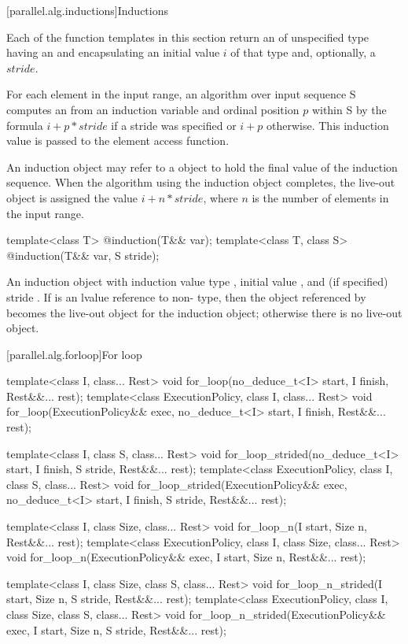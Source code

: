 [parallel.alg.inductions]{Inductions}

\pnum
Each of the function templates in this section return an  of unspecified type having an  and encapsulating an initial value $i$ of that type and, optionally, a $stride$.

\pnum
For each element in the input range, an algorithm over input sequence S computes an  from an induction variable and ordinal position $p$ within S by the formula $i + p * stride$ if a stride was specified or $i + p$ otherwise. This induction value is passed to the element access function.

\pnum
An induction object may refer to a  object to hold the final value of the induction sequence. When the algorithm using the induction object completes, the live-out object is assigned the value $i + n * stride$, where $n$ is the number of elements in the input range.

\begin{itemdecl}
template<class T>
  @\unspec@ induction(T&& var);
template<class T, class S>
  @\unspec@ induction(T&& var, S stride);
\end{itemdecl}

\begin{itemdescr}
\pnum
\returns An induction object with induction value type , initial value , and (if specified) stride . If  is an lvalue reference to non- type, then the object referenced by  becomes the live-out object for the induction object; otherwise there is no live-out object.
\end{itemdescr}

[parallel.alg.forloop]{For loop}

\begin{itemdecl}
template<class I, class... Rest>
void for_loop(no_deduce_t<I> start, I finish, Rest&&... rest);
template<class ExecutionPolicy,
      class I, class... Rest>
void for_loop(ExecutionPolicy&& exec,
              no_deduce_t<I> start, I finish, Rest&&... rest);

template<class I, class S, class... Rest>
void for_loop_strided(no_deduce_t<I> start, I finish,
                      S stride, Rest&&... rest);
template<class ExecutionPolicy,
      class I, class S, class... Rest>
void for_loop_strided(ExecutionPolicy&& exec,
                      no_deduce_t<I> start, I finish,
                      S stride, Rest&&... rest);

template<class I, class Size, class... Rest>
void for_loop_n(I start, Size n, Rest&&... rest);
template<class ExecutionPolicy,
      class I, class Size, class... Rest>
void for_loop_n(ExecutionPolicy&& exec,
                I start, Size n, Rest&&... rest);

template<class I, class Size, class S, class... Rest>
void for_loop_n_strided(I start, Size n, S stride, Rest&&... rest);
template<class ExecutionPolicy,
      class I, class Size, class S, class... Rest>
void for_loop_n_strided(ExecutionPolicy&& exec,
                        I start, Size n, S stride, Rest&&... rest);
\end{itemdecl}

